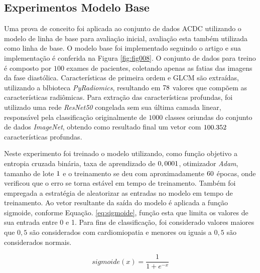 \subsection{Experimentos Modelo Base}
\label{subsec:cap5_experimentos_base}

Uma prova de conceito foi aplicada ao conjunto de dados \gls{ACDC} utilizando o modelo de linha de base para avaliação inicial, avaliação esta também utilizada como linha de base. O modelo base foi implementado seguindo o artigo e sua implementação é conferida na Figura \ref{fig:fig008}. O conjunto de dados para treino é composto por $100$ exames de pacientes, coletando apenas as fatias das imagens da fase diastólica. Características de primeira ordem e \gls{GLCM} são extraídas, utilizando a blbioteca \textit{PyRadiomics}, resultando em $78$ valores que compõem as características radiômicas. Para extração das características profundas, foi utilizado uma rede \textit{ResNet50} congelada sem sua última camada linear, responsável pela classificação originalmente de $1000$ classes oriundas do conjunto de dados \textit{ImageNet}, obtendo como resultado final um vetor com $100.352$ características profundas.


Neste experimento foi treinado o modelo utilizando, como função objetivo a entropia cruzada binária, taxa de aprendizado de $0,0001$, otimizador \textit{Adam}, tamanho de lote $1$ e o treinamento se deu com aproximadamente $60$ épocas, onde verificou que o erro se torna estável em tempo de treinamento. Também foi empregada a estratégia de aleatorizar as entradas no modelo em tempo de treinamento. Ao vetor resultante da saída do modelo é aplicada a função sigmoide, conforme Equação. \ref{eq:sigmoide}, função esta que limita os valores de sua entrada entre 0 e 1. Para fins de classificação, foi considerado valores maiores que $0,5$ são considerados com cardiomiopatia e menores ou iguais a $0,5$ são considerados normais.

\begin{equation}
\textit{sigmoide}(x) = \frac{1}{1 + e^{-x}}
\label{eq:sigmoide}
\end{equation}


